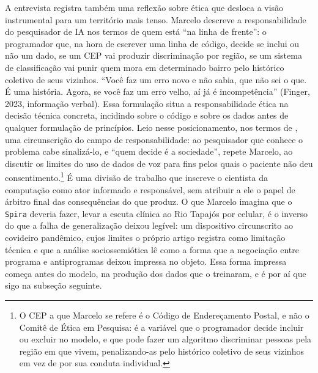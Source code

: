 A entrevista registra também uma reflexão sobre ética que desloca a visão instrumental para um território mais tenso. Marcelo descreve a responsabilidade do pesquisador de IA nos termos de quem está \enquote{na linha de frente}: o programador que, na hora de escrever uma linha de código, decide se inclui ou não um dado, se um CEP vai produzir discriminação por região, se um sistema de classificação vai punir quem mora em determinado bairro pelo histórico coletivo de seus vizinhos. \enquote{Você faz um erro novo e não sabia, que não sei o que. É uma história. Agora, se você faz um erro velho, aí já é incompetência} (Finger, 2023, informação verbal). Essa formulação situa a responsabilidade ética na decisão técnica concreta, incidindo sobre o código e sobre os dados antes de qualquer formulação de princípios. Leio nesse posicionamento, nos termos de \textcite{Akrich1992Description}, uma circunscrição do campo de responsabilidade: ao pesquisador que conhece o problema cabe sinalizá-lo, e \enquote{quem decide é a sociedade}, repete Marcelo, ao discutir os limites do uso de dados de voz para fins pelos quais o paciente não deu consentimento.\footnote{O CEP a que Marcelo se refere é o Código de Endereçamento Postal, e não o Comitê de Ética em Pesquisa: é a variável que o programador decide incluir ou excluir no modelo, e que pode fazer um algoritmo discriminar pessoas pela região em que vivem, penalizando-as pelo histórico coletivo de seus vizinhos em vez de por sua conduta individual.} É uma divisão de trabalho que inscreve o cientista da computação como ator informado e responsável, sem atribuir a ele o papel de árbitro final das consequências do que produz. O que Marcelo imagina que o \texttt{Spira} deveria fazer, levar a escuta clínica ao Rio Tapajós por celular, é o inverso do que a falha de generalização deixou legível: um dispositivo circunscrito ao covideiro pandêmico, cujos limites o próprio artigo registra como limitação técnica e que a análise sociossemiótica lê como a forma que a negociação entre programa e antiprogramas deixou impressa no objeto. Essa forma impressa começa antes do modelo, na produção dos dados que o treinaram, e é por aí que sigo na subseção seguinte.

